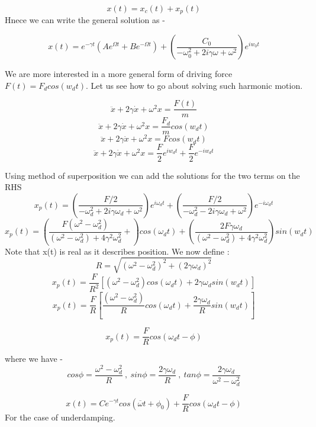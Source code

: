 \documentclass{book}
\begin{document}
\[x(t) = x_c(t)  + x_p(t)\]
Hnece we can write the general solution as - 

\begin{tcolorbox}[colback=pink!30!white, colframe=black, width=\textwidth, boxrule=0.5mm, sharp corners, left=1mm, right=1mm, top=1mm, bottom=1mm]
    \[ x(t) =  e^{-\gamma t}(Ae^{\Omega t} + Be^{-\Omega t}) + \left(\frac{C_0}{-\omega_0^2 + 2i\gamma \omega + \omega^2}\right) e^{iw_0t}\]
\end{tcolorbox}

We are more interested in a more general form of driving force \(F(t) = F_d cos(w_d t)\). Let us see how to go about solving such harmonic motion.

\[ \ddot{x} + 2\gamma \dot{x} + \omega^2 x = \frac{F(t)}{m}\]
\[ \ddot{x} + 2\gamma \dot{x} + \omega^2 x = \frac{F_d}{m} cos(w_d t)\]
\[ \ddot{x} + 2\gamma \dot{x} + \omega^2 x = F cos(w_d t)\]
\[ \ddot{x} + 2\gamma \dot{x} + \omega^2 x = \frac{F}{2} e^{iw_d t} + \frac{F}{2} e^{-iw_d t} \]

Using method of superposition we can add the solutions for the two terms on the RHS 
\[ x_p(t)= \left( \frac{F/2}{-\omega_d^2 + 2 i \gamma \omega_d + \omega^2} \right) e^{i\omega_d t} + \left( \frac{F/2}{-\omega_d^2 - 2 i \gamma \omega_d + \omega^2} \right) e^{-i\omega_d t}\]
\[ x_p(t) = \left( \frac{F(\omega^2 - \omega_d^2)}{(\omega^2 - \omega_d^2) + 4\gamma^2 \omega_d^2} + \right) cos(\omega_d t) + \left( \frac{2F\gamma \omega_d}{(\omega^2 - \omega_d^2) + 4\gamma^2 \omega_d^2} \right) sin(w_d t)\]
Note that x(t) is real as it describes position.
We now define :
\[ R = \sqrt{(\omega^2 - \omega_d^2)^2 + (2 \gamma \omega_d)^2}\]
\[x_p(t) = \frac{F}{R^2} \left[  (\omega^2 - \omega_d^2) cos(\omega_d t) + 2 \gamma \omega_d sin(w_d t)\right] \]
\[ x_p(t) = \frac{F}{R} \left[  \frac{(\omega^2 - \omega_d^2)}{R} cos(\omega_d t) + \frac{2 \gamma \omega_d}{R} sin(w_d t)\right] \]
\begin{tcolorbox}[colback=pink!30!white, colframe=black, width=\textwidth, boxrule=0.5mm, sharp corners, left=1mm, right=1mm, top=1mm, bottom=1mm]
    \[ x_p(t) = \frac{F}{R} cos(\omega_d t - \phi)\] 
\end{tcolorbox}
where we have - 
\[ cos \phi = \frac{\omega^2 - \omega_d^2}{R} \ , \ sin \phi = \frac{2 \gamma \omega_d}{R} \ , \ tan \phi = \frac{2 \gamma \omega_d}{\omega^2 - \omega_d^2}\]
\begin{tcolorbox}[colback=pink!30!white, colframe=black, width=\textwidth, boxrule=0.5mm, sharp corners, left=1mm, right=1mm, top=1mm, bottom=1mm]
\[ x(t)= C e^{-\gamma t} cos(\overline{\omega} t + \phi_0) + \frac{F}{R} cos(\omega_d t - \phi)\]
For the case of underdamping.
\end{tcolorbox}
\end{document}
